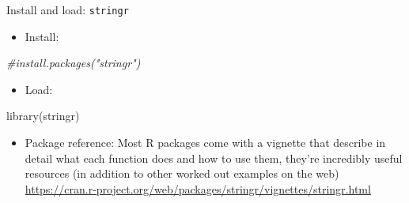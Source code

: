 \documentclass[
  ignorenonframetext,
]{beamer}
\newenvironment{Shaded}{\begin{snugshade}}{\end{snugshade}}
\newcommand{\CommentTok}[1]{\textcolor[rgb]{0.56,0.35,0.01}{\textit{#1}}}
\newcommand{\FunctionTok}[1]{\textcolor[rgb]{0.00,0.00,0.00}{#1}}
\newcommand{\NormalTok}[1]{#1}
\providecommand{\tightlist}{%
  \setlength{\itemsep}{0pt}\setlength{\parskip}{0pt}}
\begin{document}
\begin{frame}[fragile]{Install and load: \texttt{stringr}}
\protect\hypertarget{install-and-load-stringr}{}
\begin{itemize}
\tightlist
\item
  Install:
\end{itemize}

\begin{Shaded}
\begin{Highlighting}[]
\CommentTok{\#install.packages("stringr")}
\end{Highlighting}
\end{Shaded}

\begin{itemize}
\tightlist
\item
  Load:
\end{itemize}

\begin{Shaded}
\begin{Highlighting}[]
\FunctionTok{library}\NormalTok{(stringr)}
\end{Highlighting}
\end{Shaded}

\begin{itemize}
\tightlist
\item
  Package reference: Most R packages come with a vignette that describe
  in detail what each function does and how to use them, they're
  incredibly useful resources (in addition to other worked out examples
  on the web)
  \url{https://cran.r-project.org/web/packages/stringr/vignettes/stringr.html}
\end{itemize}
\end{frame}
\end{document}
